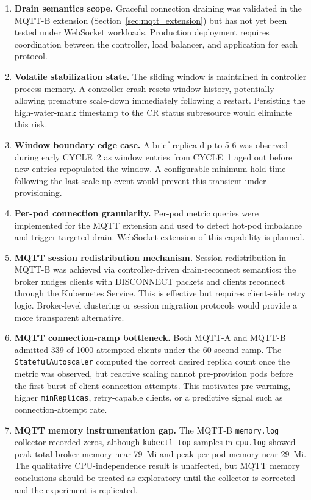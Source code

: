 \documentclass[twocolumn]{svjour3}
\begin{document}
\begin{enumerate}[leftmargin=*]
\item \textbf{Drain semantics scope.} Graceful connection draining was validated in the MQTT-B extension (Section~\ref{sec:mqtt_extension}) but has not yet been tested under WebSocket workloads. Production deployment requires coordination between the controller, load balancer, and application for each protocol.

\item \textbf{Volatile stabilization state.} The sliding window is maintained in controller process memory. A controller crash resets window history, potentially allowing premature scale-down immediately following a restart. Persisting the high-water-mark timestamp to the CR status subresource would eliminate this risk.

\item \textbf{Window boundary edge case.} A brief replica dip to 5-6 was observed during early CYCLE~2 as window entries from CYCLE~1 aged out before new entries repopulated the window. A configurable minimum hold-time following the last scale-up event would prevent this transient under-provisioning.

\item \textbf{Per-pod connection granularity.} Per-pod metric queries were implemented for the MQTT extension and used to detect hot-pod imbalance and trigger targeted drain. WebSocket extension of this capability is planned.

\item \textbf{MQTT session redistribution mechanism.} Session redistribution in MQTT-B was achieved via controller-driven drain-reconnect semantics: the broker nudges clients with DISCONNECT packets and clients reconnect through the Kubernetes Service. This is effective but requires client-side retry logic. Broker-level clustering or session migration protocols would provide a more transparent alternative.

\item \textbf{MQTT connection-ramp bottleneck.} Both MQTT-A and MQTT-B admitted 339 of 1000 attempted clients under the 60-second ramp. The \texttt{StatefulAutoscaler} computed the correct desired replica count once the metric was observed, but reactive scaling cannot pre-provision pods before the first burst of client connection attempts. This motivates pre-warming, higher \texttt{minReplicas}, retry-capable clients, or a predictive signal such as connection-attempt rate.

\item \textbf{MQTT memory instrumentation gap.} The MQTT-B \texttt{memory.log} collector recorded zeros, although \texttt{kubectl top} samples in \texttt{cpu.log} showed peak total broker memory near 79~Mi and peak per-pod memory near 29~Mi. The qualitative CPU-independence result is unaffected, but MQTT memory conclusions should be treated as exploratory until the collector is corrected and the experiment is replicated.

\end{enumerate}
\end{document}
